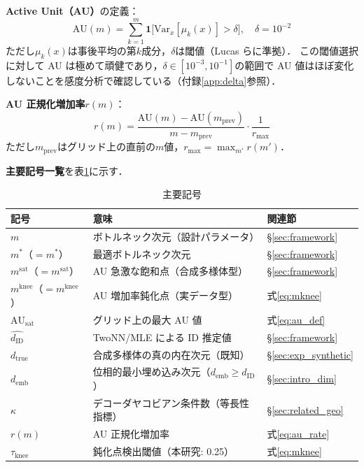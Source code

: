 \documentclass[11pt,a4paper]{jsarticle}
\newcommand{\dID}{d_{\mathrm{ID}}}
\newcommand{\dzopt}{m^*}
\newcommand{\dtrue}{d_{\mathrm{true}}}
\newcommand{\kap}{\kappa}
\newcommand{\AUsat}{\mathrm{AU}_{\mathrm{sat}}}
\newcommand{\dzsat}{m^{\mathrm{sat}}}
\newcommand{\mknee}{m^{\mathrm{knee}}}
\newcommand{\demb}{d_{\mathrm{emb}}}
\begin{document}
\textbf{Active Unit（AU）}の定義：
\begin{equation}
  \mathrm{AU}(m) = \sum_{k=1}^{m} \mathbf{1}\bigl[\mathrm{Var}_x[\mu_k(x)] > \delta\bigr],
  \quad \delta = 10^{-2}
  \label{eq:au_def}
\end{equation}
ただし$\mu_k(x)$は事後平均の第$k$成分，$\delta$は閾値（Lucas ら\cite{lucas2019elbo}に準拠）．
この閾値選択に対して AU は極めて頑健であり，$\delta \in [10^{-3}, 10^{-1}]$の範囲で AU 値はほぼ変化しないことを感度分析で確認している（付録\ref{app:delta}参照）．

\textbf{AU 正規化増加率}$r(m)$：
\begin{equation}
  r(m) = \frac{\mathrm{AU}(m) - \mathrm{AU}(m_{\mathrm{prev}})}{m - m_{\mathrm{prev}}} \cdot \frac{1}{r_{\max}}
  \label{eq:au_rate}
\end{equation}
ただし$m_{\mathrm{prev}}$はグリッド上の直前の$m$値，$r_{\max} = \max_{m'} r(m')$．

\textbf{主要記号一覧}を表\ref{tab:notation}に示す．

\begin{table}[H]
\centering
\caption{主要記号}
\label{tab:notation}
\small
\begin{tabular}{lll}
\toprule
記号 & 意味 & 関連節 \\
\midrule
$m$ & ボトルネック次元（設計パラメータ） & §\ref{sec:framework} \\
$\dzopt$（$= m^*$） & 最適ボトルネック次元 & §\ref{sec:framework} \\
$\dzsat$（$= m^{\mathrm{sat}}$） & AU 急激な飽和点（合成多様体型） & §\ref{sec:framework} \\
$\mknee$（$= m^{\mathrm{knee}}$） & AU 増加率鈍化点（実データ型） & 式\eqref{eq:mknee} \\
$\AUsat$ & グリッド上の最大 AU 値 & 式\eqref{eq:au_def} \\
$\hat{\dID}$ & TwoNN/MLE による ID 推定値 & §\ref{sec:framework} \\
$\dtrue$ & 合成多様体の真の内在次元（既知） & §\ref{sec:exp_synthetic} \\
$\demb$ & 位相的最小埋め込み次元（$\demb \geq \dID$） & §\ref{sec:intro_dim} \\
$\kap$ & デコーダヤコビアン条件数（等長性指標） & §\ref{sec:related_geo} \\
$r(m)$ & AU 正規化増加率 & 式\eqref{eq:au_rate} \\
$\tau_{\mathrm{knee}}$ & 鈍化点検出閾値（本研究: 0.25） & 式\eqref{eq:mknee} \\
\bottomrule
\end{tabular}
\end{table}
\end{document}
